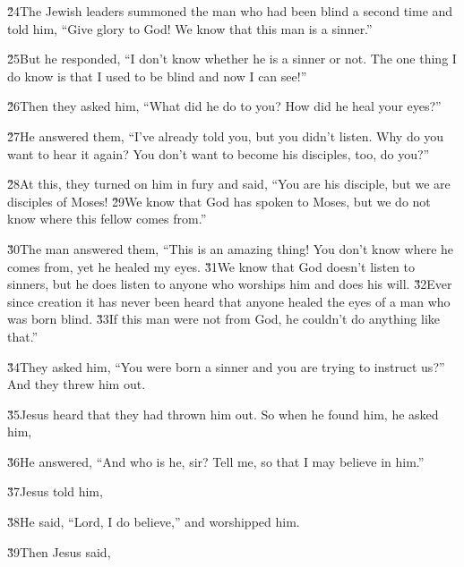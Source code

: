 \v{24}The Jewish leaders summoned the man who had been blind a second time and told him, ``Give glory to God! We know that this man is a sinner.''

\v{25}But he responded, ``I don't know whether he is a sinner or not. The one thing I do know is that I used to be blind and now I can see!''

\v{26}Then they asked him, ``What did he do to you? How did he heal your eyes?''

\v{27}He answered them, ``I've already told you, but you didn't listen. Why do you want to hear it again? You don't want to become his disciples, too, do you?''

\v{28}At this, they turned on him in fury and said, ``You are his disciple, but we are disciples of Moses! \v{29}We know that God has spoken to Moses, but we do not know where this fellow comes from.''

\v{30}The man answered them, ``This is an amazing thing! You don't know where he comes from, yet he healed my eyes. \v{31}We know that God doesn't listen to sinners, but he does listen to anyone who worships him and does his will. \v{32}Ever since creation it has never been heard that anyone healed the eyes of a man who was born blind. \v{33}If this man were not from God, he couldn't do anything like that.''

\v{34}They asked him, ``You were born a sinner and you are trying to instruct us?'' And they threw him out.

\v{35}Jesus heard that they had thrown him out. So when he found him, he asked him, 

\v{36}He answered, ``And who is he, sir? Tell me, so that I may believe in him.''

\v{37}Jesus told him, 

\v{38}He said, ``Lord, I do believe,'' and worshipped him.

\v{39}Then Jesus said, 

